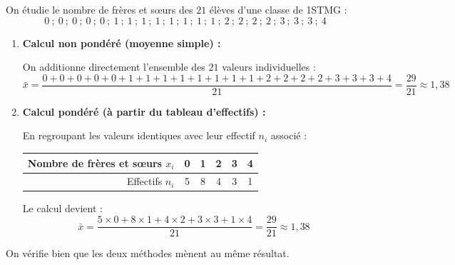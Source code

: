\begin{ex}
	On étudie le nombre de frères et sœurs des $21$ élèves d'une classe de 1STMG :
	\[
		0 \ ; \ 0 \ ; \ 0 \ ; \ 0 \ ; \ 0 \ ; \ 1 \ ; \ 1 \ ; \ 1 \ ; \ 1 \ ; \ 1 \ ; \ 1 \ ; \ 1 \ ; \ 1 \ ; \ 2 \ ; \ 2 \ ; \ 2 \ ; \ 2 \ ; \ 3 \ ; \ 3 \ ; \ 3 \ ; \ 4
	\]

	\begin{enumerate}
		\item \textbf{Calcul non pondéré (moyenne simple) :}

		      On additionne directement l'ensemble des $21$ valeurs individuelles :
		      \[
			      \bar{x} = \dfrac{0 + 0 + 0 + 0 + 0 + 1 + 1 + 1 + 1 + 1 + 1 + 1 + 1 + 2 + 2 + 2 + 2 + 3 + 3 + 3 + 4}{21} = \dfrac{29}{21} \approx 1{,}38
		      \]

		\item \textbf{Calcul pondéré (à partir du tableau d'effectifs) :}

		      En regroupant les valeurs identiques avec leur effectif $n_i$ associé :
		      \begin{center}
			      \begin{tabular}{|r|c|c|c|c|c|} \hline
				      \rowcolor{gray!30} Nombre de frères et sœurs $x_i$ & 0 & 1 & 2 & 3 & 4 \\ \hline
				      Effectifs $n_i$                                    & 5 & 8 & 4 & 3 & 1 \\ \hline
			      \end{tabular}
		      \end{center}

		      Le calcul devient :
		      \[
			      \bar{x} = \dfrac{5 \times 0 + 8 \times 1 + 4 \times 2 + 3 \times 3 + 1 \times 4}{21} = \dfrac{29}{21} \approx 1{,}38
		      \]
	\end{enumerate}

	On vérifie bien que les deux méthodes mènent au même résultat.
\end{ex}

